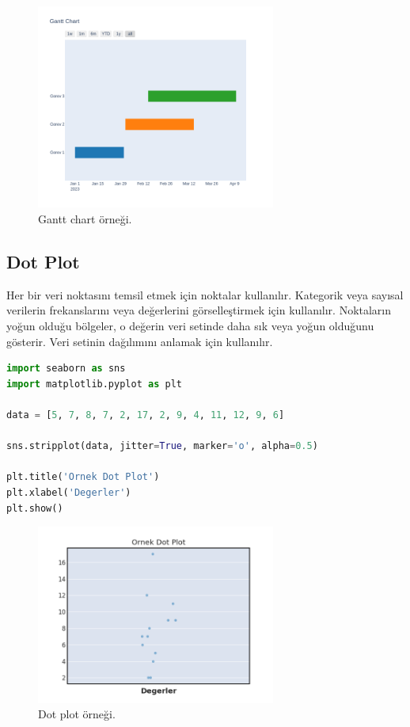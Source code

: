 \begin{figure}[h]
    \centering
    \includegraphics[width=0.7\textwidth]{images/gantt_chart.png}
    \caption{Gantt chart örneği.}
    \label{fig:enter-label}
\end{figure}

\newpage

\subsection{Dot Plot}
Her bir veri noktasını temsil etmek için noktalar kullanılır. Kategorik veya sayısal verilerin frekanslarını veya değerlerini görselleştirmek için kullanılır. Noktaların yoğun olduğu bölgeler, o değerin veri setinde daha sık veya yoğun olduğunu gösterir. Veri setinin dağılımını anlamak için kullanılır.

\begin{lstlisting}[language=Python]
import seaborn as sns
import matplotlib.pyplot as plt

data = [5, 7, 8, 7, 2, 17, 2, 9, 4, 11, 12, 9, 6]

sns.stripplot(data, jitter=True, marker='o', alpha=0.5)

plt.title('Ornek Dot Plot')
plt.xlabel('Degerler')
plt.show()
\end{lstlisting}

\begin{figure}[h]
    \centering
    \includegraphics[width=0.7\textwidth]{images/dot_plot.png}
    \caption{Dot plot örneği.}
    \label{fig:enter-label}
\end{figure}

